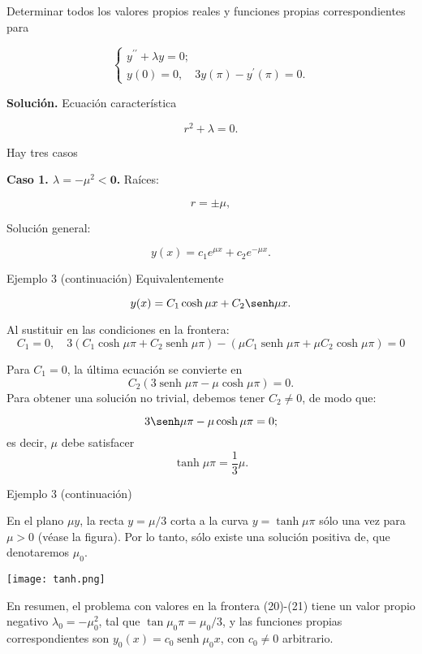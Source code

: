  Determinar todos los valores propios reales y funciones propias correspondientes para
 
 $$
\left\{\begin{array}{l}
            y^{\prime \prime}+\lambda y=0;\\
            y(0)=0, \quad 3 y(\pi)-y^{\prime}(\pi)=0.
\end{array} \right.
$$


\textbf{Solución.} Ecuación característica 

$$r^{2}+\lambda=0.$$

Hay tres casos

\textbf{Caso 1. $\lambda=-\mu^{2}<\mathbf{0}$.} Raíces:

$$r=\pm \mu,$$

Solución general:

$$y(x)=c_{1} e^{\mu x}+c_{2} e^{-\mu x}.$$ 



 

{Ejemplo 3 (continuación)}
Equivalentemente 

$$y(x)=C_{1} \cosh \mu x+C_{2} \senh \mu x.$$

Al sustituir en las condiciones en la frontera:
$$
C_{1}=0, \quad 3\left(C_{1} \cosh \mu \pi+C_{2} \operatorname{senh} \mu \pi\right)-\left(\mu C_{1} \operatorname{senh} \mu \pi+\mu C_{2} \cosh \mu \pi\right)=0
$$

Para $C_{1}=0$, la última ecuación se convierte en
$$
C_{2}(3 \operatorname{senh} \mu \pi-\mu \cosh \mu \pi)=0 .
$$
Para obtener una solución no trivial, debemos tener $C_{2} \neq 0$, de modo que:

$$3 \senh \mu \pi-\mu\cosh \mu \pi=0;$$
es decir, $\mu$ debe satisfacer
 $$\tanh \mu \pi=\frac{1}{3} \mu.$$
 
 


 

{Ejemplo 3 (continuación)}
 

En el plano $\mu y$, la recta $y=\mu / 3$ corta a la curva $y=\tanh \mu \pi$ sólo una vez para $\mu>0$ (véase la figura). Por lo tanto, sólo existe una solución positiva de, que denotaremos $\mu_{0}$.


\texttt{[image: tanh.png]}

En resumen, el problema con valores en la frontera (20)-(21) tiene un valor propio negativo $\lambda_{0}=-\mu_{0}^{2}$, tal que $\tan \mu_{0} \pi=\mu_{0} / 3$, y las funciones propias correspondientes son $y_{0}(x)=c_{0} \operatorname{senh} \mu_{0} x$, con $c_{0} \neq 0$ arbitrario.



